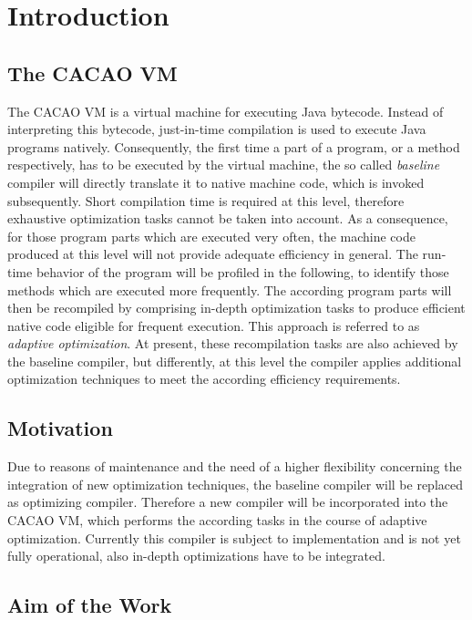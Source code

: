 \section{Introduction}
\label{sec:introduction}

\subsection{The CACAO VM}
\label{sec:the-cacao-vm}

The CACAO VM is a virtual machine for executing Java bytecode. Instead of interpreting this bytecode, just-in-time compilation is used to execute Java programs natively. Consequently, the first time a part of a program, or a method respectively, has to be executed by the virtual machine, the so called \emph{baseline} compiler will directly translate it to native machine code, which is invoked subsequently. Short compilation time is required at this level, therefore exhaustive optimization tasks cannot be taken into account. As a consequence, for those program parts which are executed very often, the machine code produced at this level will not provide adequate efficiency in general. The run-time behavior of the program will be profiled in the following, to identify those methods which are executed more frequently. The according program parts will then be recompiled by comprising in-depth optimization tasks to produce efficient native code eligible for frequent execution. This approach is referred to as \emph{adaptive optimization}. At present, these recompilation tasks are also achieved by the baseline compiler, but differently, at this level the compiler applies additional optimization techniques to meet the according efficiency requirements.

\subsection{Motivation}
\label{sec:motivation}

Due to reasons of maintenance and the need of a higher flexibility concerning the integration of new optimization techniques, the baseline compiler will be replaced as optimizing compiler. Therefore a new compiler will be incorporated into the CACAO VM, which performs the according tasks in the course of adaptive optimization. Currently this compiler is subject to implementation and is not yet fully operational, also in-depth optimizations have to be integrated.

\subsection{Aim of the Work}
\label{sec:aim}

